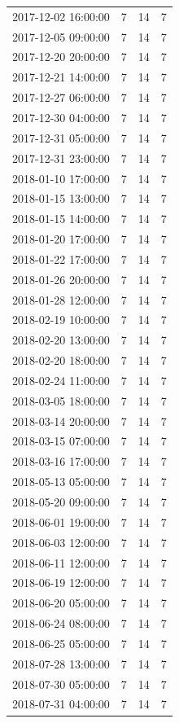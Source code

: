\begin{tabular}{lrrr}
2017-12-02 16:00:00 & 7 & 14 & 7 \\
2017-12-05 09:00:00 & 7 & 14 & 7 \\
2017-12-20 20:00:00 & 7 & 14 & 7 \\
2017-12-21 14:00:00 & 7 & 14 & 7 \\
2017-12-27 06:00:00 & 7 & 14 & 7 \\
2017-12-30 04:00:00 & 7 & 14 & 7 \\
2017-12-31 05:00:00 & 7 & 14 & 7 \\
2017-12-31 23:00:00 & 7 & 14 & 7 \\
2018-01-10 17:00:00 & 7 & 14 & 7 \\
2018-01-15 13:00:00 & 7 & 14 & 7 \\
2018-01-15 14:00:00 & 7 & 14 & 7 \\
2018-01-20 17:00:00 & 7 & 14 & 7 \\
2018-01-22 17:00:00 & 7 & 14 & 7 \\
2018-01-26 20:00:00 & 7 & 14 & 7 \\
2018-01-28 12:00:00 & 7 & 14 & 7 \\
2018-02-19 10:00:00 & 7 & 14 & 7 \\
2018-02-20 13:00:00 & 7 & 14 & 7 \\
2018-02-20 18:00:00 & 7 & 14 & 7 \\
2018-02-24 11:00:00 & 7 & 14 & 7 \\
2018-03-05 18:00:00 & 7 & 14 & 7 \\
2018-03-14 20:00:00 & 7 & 14 & 7 \\
2018-03-15 07:00:00 & 7 & 14 & 7 \\
2018-03-16 17:00:00 & 7 & 14 & 7 \\
2018-05-13 05:00:00 & 7 & 14 & 7 \\
2018-05-20 09:00:00 & 7 & 14 & 7 \\
2018-06-01 19:00:00 & 7 & 14 & 7 \\
2018-06-03 12:00:00 & 7 & 14 & 7 \\
2018-06-11 12:00:00 & 7 & 14 & 7 \\
2018-06-19 12:00:00 & 7 & 14 & 7 \\
2018-06-20 05:00:00 & 7 & 14 & 7 \\
2018-06-24 08:00:00 & 7 & 14 & 7 \\
2018-06-25 05:00:00 & 7 & 14 & 7 \\
2018-07-28 13:00:00 & 7 & 14 & 7 \\
2018-07-30 05:00:00 & 7 & 14 & 7 \\
2018-07-31 04:00:00 & 7 & 14 & 7 \\

\end{tabular}
